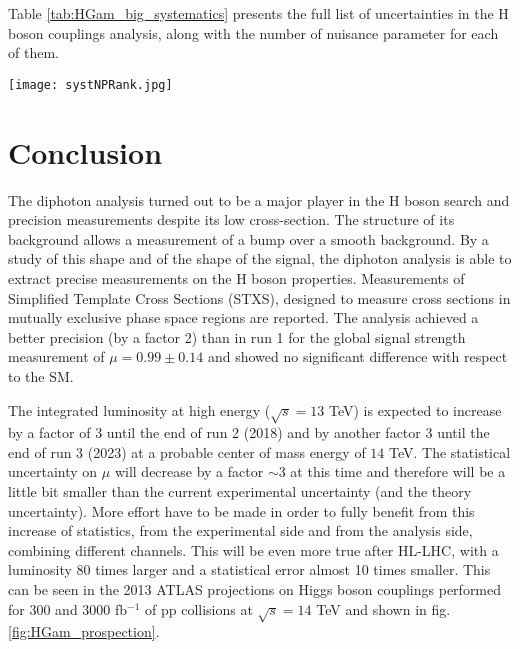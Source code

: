 \begin{enumerate}
  \label{sec:org5b8bbd9}
Table \ref{tab:HGam_big_systematics} presents the full list of uncertainties in the H boson couplings analysis, along with the number of nuisance parameter for each of them.


\begin{table}[h!]
  \begin{center}
    \texttt{[image: systNPRank.jpg]}
\caption{Summary of sources of systematic uncertainty $\sigma_i$ ($i$ is the index to each of the unique nuisance parameters~$\theta$);
the factor in the likelihood function ${F_\mathrm{G}(\sigma,\theta)}$ or ${F_\mathrm{LN}(\sigma,\theta)}$
that implements their impact on signal yields,
mass resolution and scale, and the spurious signals resulting from the background parameterization.%
When acting on $N_\mathrm{S}^\mathrm{tot}$ the  uncertainty value is  the same for  all processes,
whereas  the uncertainty has a different value for each signal process for  the case  denoted~$N_\mathrm{S}^{p}$.
\cite{ATLAS-CONF-2017-045}}
\label{tab:HGam_big_systematics}
\end{center}
\end{table}
\end{enumerate}



\section{Conclusion}
\label{sec:orgffb6129}
The diphoton analysis turned out to be a major player in the H boson search and precision measurements despite its low cross-section.
The structure of its background allows a measurement of a bump over a smooth background.
By a study of this shape and of the shape of the signal, the diphoton analysis is able to extract precise measurements on the H boson properties.
Measurements of Simplified Template Cross Sections (STXS), designed to measure cross sections in mutually exclusive phase space regions are reported.
The analysis achieved a better precision (by a factor 2) than in run 1 for the global signal strength measurement of $\mu=0.99\pm 0.14$ and showed no significant difference with respect to the SM.

The integrated luminosity at high energy ($\sqrt{s}=13$ TeV) is expected to increase by a factor of 3 until the end of run 2 (2018) and by another factor 3 until the end of run 3 (2023) at a probable center of mass energy of $14$ TeV.
The statistical uncertainty on $\mu$ will decrease by a factor $\sim 3$ at this time and therefore will be a little bit smaller than the current experimental uncertainty (and the theory uncertainty).
More effort have to be made in order to fully benefit from this increase of statistics, from the experimental side and from the analysis side, combining different channels.
This will be even more true after HL-LHC, with a luminosity 80 times larger and a statistical error almost 10 times smaller.
This can be seen in the 2013 ATLAS projections on Higgs boson couplings performed for 300 and 3000 fb$^{-1}$ of pp collisions at $\sqrt{s}=14$ TeV \cite{ATL-PHYS-PUB-2013-014} and shown in fig. \ref{fig:HGam_prospection}.

